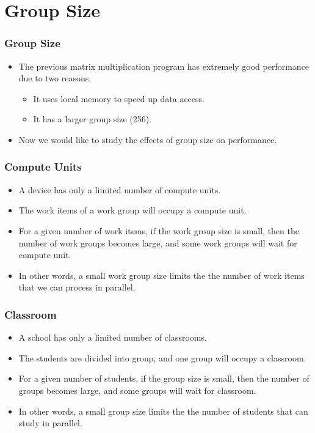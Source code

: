 \documentclass{beamer}
\begin{document}
\section{Group Size}

\begin{frame}
  \frametitle{Group Size}
  \begin{itemize}
  \item The previous matrix multiplication program has extremely good
    performance due to two reasons.
    \begin{itemize}
      \item It uses local memory to speed up data access.
      \item It has a larger group size (256).
    \end{itemize}
    \item Now we would like to study the effects of group size on
      performance.
  \end{itemize}
\end{frame}

\begin{frame}
  \frametitle{Compute Units}
  \begin{itemize}
    \item A device has only a limited number of compute units.
    \item The work items of a work group will occupy a compute unit.
    \item For a given number of work items, if the work group size is
      small, then the number of work groups becomes large, and some
      work groups will wait for compute unit.
    \item In other words, a small work group size limits the the
      number of work items that we can process in parallel.
  \end{itemize}
\end{frame}

\begin{frame}
  \frametitle{Classroom}
  \begin{itemize}
    \item A school has only a limited number of classrooms.
    \item The students are divided into group, and one group will
      occupy a classroom.
    \item For a given number of students, if the group size is small,
      then the number of groups becomes large, and some groups will
      wait for classroom.
    \item In other words, a small group size limits the the number of
      students that can study in parallel.
  \end{itemize}
\end{frame}
\end{document}
